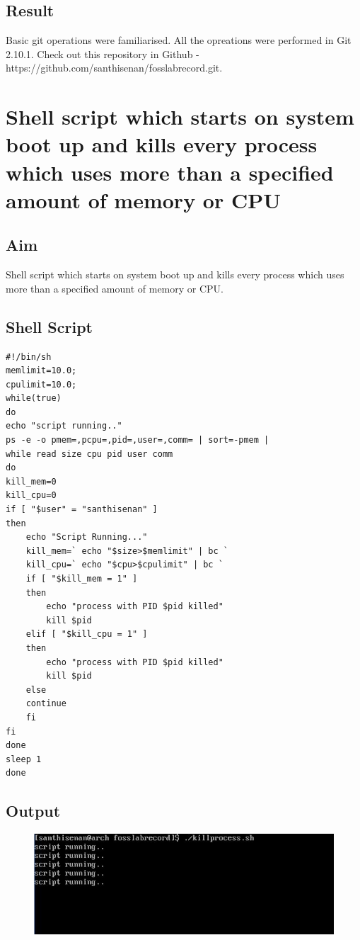 \documentclass{article}
\begin{document}
\subsection{Result}

Basic git operations were familiarised. All the opreations were performed in Git 2.10.1. Check out this repository in Github - https://github.com/santhisenan/fosslabrecord.git.

\begin{refsection}
\cite{gitdoc}
\cite{gitdoc1}
\printbibliography
\end{refsection}
\newpage
\section{Shell script which starts on system boot up and kills every process which uses more than a specified amount of memory or CPU}

\subsection{Aim}
Shell script which starts on system boot up and kills every process which uses more than a specified amount of memory or CPU.

\subsection{Shell Script}
\begin{verbatim}
#!/bin/sh
memlimit=10.0;
cpulimit=10.0;
while(true)
do
echo "script running.."
ps -e -o pmem=,pcpu=,pid=,user=,comm= | sort=-pmem |
while read size cpu pid user comm
do 
kill_mem=0
kill_cpu=0
if [ "$user" = "santhisenan" ]
then
    echo "Script Running..."
    kill_mem=` echo "$size>$memlimit" | bc `
    kill_cpu=` echo "$cpu>$cpulimit" | bc `
    if [ "$kill_mem = 1" ]
    then
        echo "process with PID $pid killed"
        kill $pid
    elif [ "$kill_cpu = 1" ]
    then
        echo "process with PID $pid killed"
        kill $pid
    else
    continue
    fi
fi
done
sleep 1
done

\end{verbatim}

\subsection{Output}
\begin{figure}[h!]
	\includegraphics[width=\linewidth]{./outputs/killprocessnew.jpg}
\end{figure}
\end{document}
